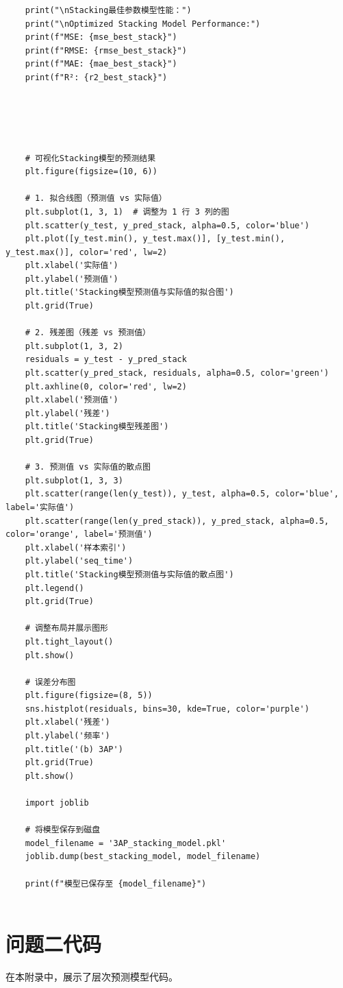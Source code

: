\documentclass[bwprint]{gmcmthesis}
\begin{document}
\begin{lstlisting}
	print("\nStacking最佳参数模型性能：")
	print("\nOptimized Stacking Model Performance:")
	print(f"MSE: {mse_best_stack}")
	print(f"RMSE: {rmse_best_stack}")
	print(f"MAE: {mae_best_stack}")
	print(f"R²: {r2_best_stack}")
	
	
	
	
	
	# 可视化Stacking模型的预测结果
	plt.figure(figsize=(10, 6))
	
	# 1. 拟合线图（预测值 vs 实际值）
	plt.subplot(1, 3, 1)  # 调整为 1 行 3 列的图
	plt.scatter(y_test, y_pred_stack, alpha=0.5, color='blue')
	plt.plot([y_test.min(), y_test.max()], [y_test.min(), y_test.max()], color='red', lw=2)
	plt.xlabel('实际值')
	plt.ylabel('预测值')
	plt.title('Stacking模型预测值与实际值的拟合图')
	plt.grid(True)
	
	# 2. 残差图（残差 vs 预测值）
	plt.subplot(1, 3, 2)
	residuals = y_test - y_pred_stack
	plt.scatter(y_pred_stack, residuals, alpha=0.5, color='green')
	plt.axhline(0, color='red', lw=2)
	plt.xlabel('预测值')
	plt.ylabel('残差')
	plt.title('Stacking模型残差图')
	plt.grid(True)
	
	# 3. 预测值 vs 实际值的散点图
	plt.subplot(1, 3, 3)
	plt.scatter(range(len(y_test)), y_test, alpha=0.5, color='blue', label='实际值')
	plt.scatter(range(len(y_pred_stack)), y_pred_stack, alpha=0.5, color='orange', label='预测值')
	plt.xlabel('样本索引')
	plt.ylabel('seq_time')
	plt.title('Stacking模型预测值与实际值的散点图')
	plt.legend()
	plt.grid(True)
	
	# 调整布局并展示图形
	plt.tight_layout()
	plt.show()
	
	# 误差分布图
	plt.figure(figsize=(8, 5))
	sns.histplot(residuals, bins=30, kde=True, color='purple')
	plt.xlabel('残差')
	plt.ylabel('频率')
	plt.title('(b) 3AP')
	plt.grid(True)
	plt.show()
	
	import joblib
	
	# 将模型保存到磁盘
	model_filename = '3AP_stacking_model.pkl'
	joblib.dump(best_stacking_model, model_filename)
	
	print(f"模型已保存至 {model_filename}")
	
\end{lstlisting}




\section{问题二代码}
\noindent 在本附录中，展示了层次预测模型代码。
\end{document}

